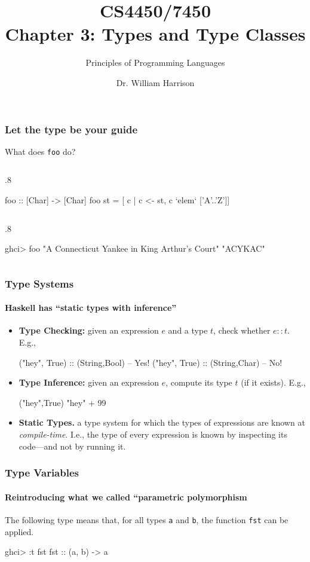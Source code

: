 \documentclass{beamer}
\title[CS4450]{CS4450/7450\\Chapter 3: Types and Type Classes}
\subtitle{Principles of Programming Languages}
\author[Bill Harrison]{Dr. William Harrison}
\institute{University of Missouri}
\newenvironment{codeblock}[1][.8]{%
\begin{columns}
\begin{column}{#1\linewidth}
\begin{exampleblock}{}}{%
\end{exampleblock}
\end{column}
\end{columns}}
\begin{document}
\frame{\titlepage}

\begin{frame}[fragile]
\frametitle{Let the type be your guide}

What does \verb+foo+ do?
\begin{codeblock}
\begin{hcode}
foo :: [Char] -> [Char]  
foo st = [ c | c <- st, c `elem` ['A'..'Z']] 
\end{hcode}
\end{codeblock}

\pause
\begin{codeblock}
\begin{hcode}
ghci> foo "A Connecticut Yankee in King Arthur's Court"
"ACYKAC"
\end{hcode}
\end{codeblock}

\end{frame}


\begin{frame}[fragile]
\frametitle{Type Systems}
\framesubtitle{Haskell has ``static types with inference''}

\begin{itemize}
\item {\bf Type Checking:} given an expression $e$ and a type $t$, check whether $e :: t$. E.g., 
\begin{hcode}
("hey", True) :: (String,Bool) -- Yes!
("hey", True) :: (String,Char) -- No!
\end{hcode}

\pause
\item {\bf{Type Inference:}} given an expression $e$, compute its type $t$ (if it exists). E.g., 
\begin{hcode}
("hey",True)   %
"hey" + 99     %
\end{hcode}

\pause 
\item {\bf Static Types.} a type system for which the types of expressions are known at \emph{compile-time}. I.e., the type of every expression is known by inspecting its code---and not by running it.
\end{itemize}

\end{frame}


\begin{frame}[fragile]
\frametitle{Type Variables}
\framesubtitle{Reintroducing what we called ``parametric polymorphism}

The following type means that, for all types \verb+a+ and \verb+b+, the function \verb+fst+ can be applied.
\begin{hcode}
ghci> :t fst  
fst :: (a, b) -> a 
\end{hcode}

\end{frame}
\end{document}
